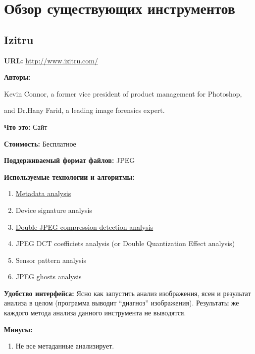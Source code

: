 \chapter*{Обзор существующих инструментов}
\setcounter{chapter}{1}
%

\section{Izitru}

\textbf{URL: } \url{http://www.izitru.com/}

\textbf{Авторы:}

Kevin Connor, a former vice president of product management for Photoshop,

and Dr.Hany Farid, a leading image forensics expert.

\textbf{Что это:} Сайт

\textbf{Стоимость:} Бесплатное

\textbf{Поддерживаемый формат файлов:} JPEG

\textbf{Используемые технологии и алгоритмы:}

\begin{enumerate}
  \item \href{http://fotoforensics.com/tutorial-meta.php}{Metadata analysis}
  \item Device signature analysis
  
  \label{itm:DCAA}
  \item \hypertarget{itm:DCAB}{\hyperlink{itm:DCAA}{Double JPEG compression detection analysis}}
  
  \item JPEG DCT coefficiets analysis (or Double Quantization Effect analysis)
  
  \item Sensor pattern analysis
  
  \item JPEG ghosts analysis
\end{enumerate} 

\textbf{Удобство интерфейса:}
Ясно как запустить анализ изображения, ясен и результат анализа в целом (программа выводит “диагноз” изображения). Результаты же каждого метода анализа данного инструмента не выводятся.


\textbf{Минусы:}
\begin{enumerate}
  \item	Не все метаданные анализирует.
\end{enumerate}
  
